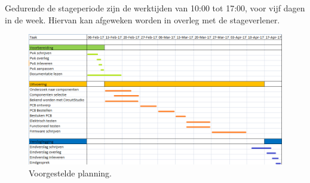 Gedurende de stageperiode zijn de werktijden van 10:00 tot 17:00, voor vijf dagen in de week. Hiervan kan afgeweken worden in overleg met de stageverlener. 

\begin{figure}[hbtp]
	\centering
	\includegraphics[width=1.0\textwidth]{figures/planning.png}
	\caption{Voorgestelde planning.}
	\label{fig:planning}
\end{figure}
